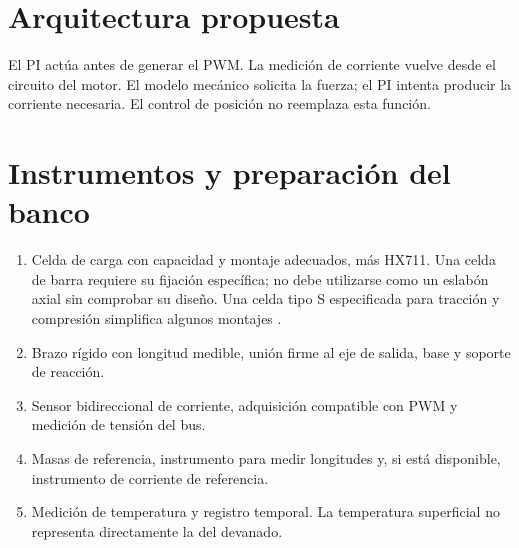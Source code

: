 \documentclass[11pt,a4paper]{article}
\newcommand{\sat}{\operatorname{sat}}
\begin{document}
\section{Arquitectura propuesta}
\begin{center}
\end{center}
El PI actúa antes de generar el PWM. La medición de corriente vuelve desde el circuito del motor. El modelo mecánico solicita la fuerza; el PI intenta producir la corriente necesaria. El control de posición no reemplaza esta función.

\section{Instrumentos y preparación del banco}
\begin{enumerate}
\item Celda de carga con capacidad y montaje adecuados, más HX711. Una celda de barra requiere su fijación específica; no debe utilizarse como un eslabón axial sin comprobar su diseño. Una celda tipo S especificada para tracción y compresión simplifica algunos montajes \cite{montaje}.
\item Brazo rígido con longitud medible, unión firme al eje de salida, base y soporte de reacción.
\item Sensor bidireccional de corriente, adquisición compatible con PWM y medición de tensión del bus.
\item Masas de referencia, instrumento para medir longitudes y, si está disponible, instrumento de corriente de referencia.
\item Medición de temperatura y registro temporal. La temperatura superficial no representa directamente la del devanado.
\end{enumerate}
\end{document}
